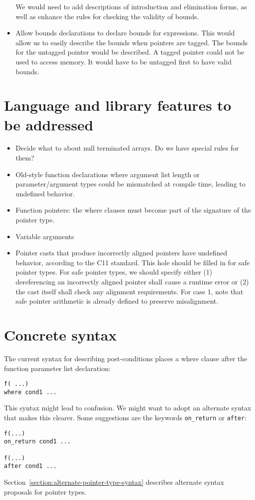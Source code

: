 \begin{itemize}
We would need to add descriptions of introduction and elimination
forms, as well as enhance the rules for checking the validity of bounds.
\item Allow bounds declarations to declare bounds for expressions.
This would allow us to easily describe the bounds when pointers are tagged.
The bounds for the untagged pointer would be described. 
A tagged pointer could not be used to access memory.  It would have to be
untagged first  to have valid bounds.
\end{itemize}

\section{Language and library features to be addressed}

\begin{itemize}
\item
  Decide what to about null terminated arrays. Do we have special rules
  for them?
\item
  Old-style function declarations where argument list length or
  parameter/argument types could be mismatched at compile time, leading
  to undefined behavior.
\item
  Function pointers: the where clauses must become part of the signature
  of the pointer type.
\item
  Variable arguments
\item
  Pointer casts that produce incorrectly aligned pointers have undefined
  behavior, according to the C11 standard. This hole should be filled in
  for safe pointer types. For safe pointer types, we should specify
  either (1) dereferencing an incorrectly aligned pointer shall cause a
  runtime error or (2) the cast itself shall check any alignment
  requirements. For case 1, note that safe pointer arithmetic is already
  defined to preserve misalignment.
\end{itemize}

\section{Concrete syntax}
 
The current syntax for describing post-conditions places a where clause
after the function parameter list declaration:

\begin{verbatim}
f( ...)
where cond1 ...
\end{verbatim}

This syntax might lead to confusion. We might want to adopt an alternate
syntax that makes this clearer. Some suggestions are the keywords
\texttt{on\_return} or \texttt{after}:

\begin{verbatim}
f(...)
on_return cond1 ...

f(...)
after cond1 ...
\end{verbatim}

Section~\ref{section:alternate-pointer-type-syntax} describes alternate
syntax proposals for pointer types.
